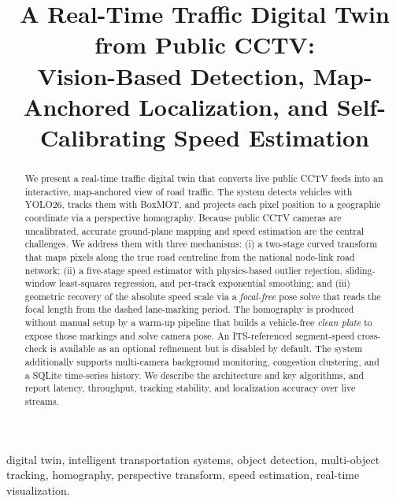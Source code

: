 \documentclass[conference]{IEEEtran}
\renewcommand{\_}{\textunderscore\allowbreak}
\begin{document}
\title{A Real-Time Traffic Digital Twin from Public CCTV:\\
Vision-Based Detection, Map-Anchored Localization, and Self-Calibrating Speed Estimation}

\author{
\and
{}
}

\maketitle

\begin{abstract}
We present a real-time traffic digital twin that converts live public CCTV feeds
into an interactive, map-anchored view of road traffic. The system detects vehicles
with YOLO26, tracks them with BoxMOT, and projects each pixel position to a
geographic coordinate via a perspective homography. Because public CCTV cameras are
uncalibrated, accurate ground-plane mapping and speed estimation are the central
challenges. We address them with three mechanisms: (i) a two-stage curved transform
that maps pixels along the true road centreline from the national node-link road
network; (ii) a five-stage speed estimator with physics-based outlier rejection,
sliding-window least-squares regression, and per-track exponential smoothing; and
(iii) geometric recovery of the absolute speed scale via a \emph{focal-free} pose solve
that reads the focal length from the dashed lane-marking period. The homography is
produced without manual setup by a warm-up pipeline that builds a vehicle-free
\emph{clean plate} to expose those markings and solve camera pose. An ITS-referenced
segment-speed cross-check is available as an optional refinement but is disabled by
default. The system additionally supports multi-camera background monitoring,
congestion clustering, and a SQLite time-series history. We describe the
architecture and key algorithms, and report latency, throughput, tracking
stability, and localization accuracy over live streams.
\end{abstract}

\begin{IEEEkeywords}
digital twin, intelligent transportation systems, object detection, multi-object
tracking, homography, perspective transform, speed estimation, real-time
visualization.
\end{IEEEkeywords}
\end{document}
